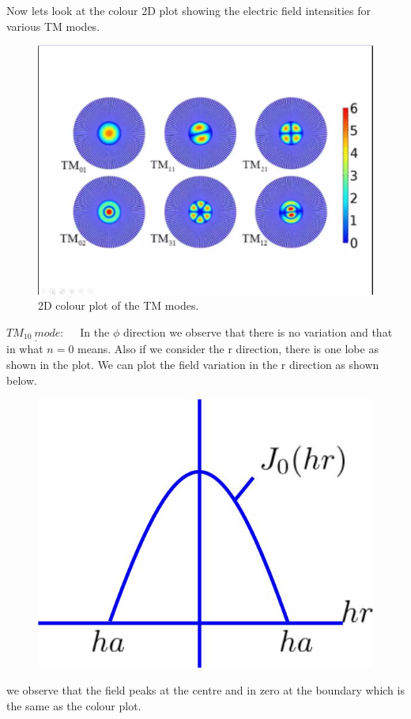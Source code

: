 Now lets look at the colour 2D plot showing the electric field intensities for various TM modes.
\begin{figure}[h]
\centering
\includegraphics[width=0.7\linewidth]{./graphics/colourplot}
\caption{2D colour plot of the TM modes.}
\label{fig:colourplot}
\end{figure}
$\underline{TM_{10} \ mode:}$ \ \ In the $\phi$ direction we observe that there is no variation and that in what $n=0$ means. Also if we consider the r direction, there is one lobe as shown in the plot. We can plot the field variation  in the r direction as shown below.
\begin{figure}[h]
\centering
\includegraphics[width=0.5\linewidth]{./graphics/m1}
\caption{}
\label{fig:m1}
\end{figure}
we observe that the field peaks at the centre and in zero at the boundary which is the same as the colour plot.
      
